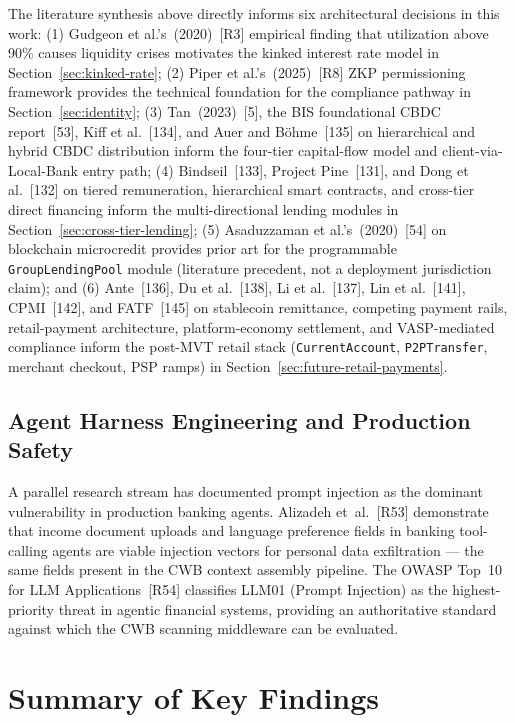 \documentclass[12pt,a4paper]{report}
\begin{document}
The literature synthesis above directly informs six architectural decisions in this work: (1) Gudgeon et al.'s~(2020)~[R3] empirical finding that utilization above 90\% causes liquidity crises motivates the kinked interest rate model in Section~\ref{sec:kinked-rate}; (2) Piper et al.'s~(2025)~[R8] ZKP permissioning framework provides the technical foundation for the compliance pathway in Section~\ref{sec:identity}; (3) Tan~(2023)~[5], the BIS foundational CBDC report~[53], Kiff et al.~[134], and Auer and B\"{o}hme~[135] on hierarchical and hybrid CBDC distribution inform the four-tier capital-flow model and client-via-Local-Bank entry path; (4) Bindseil~[133], Project Pine~[131], and Dong et al.~[132] on tiered remuneration, hierarchical smart contracts, and cross-tier direct financing inform the multi-directional lending modules in Section~\ref{sec:cross-tier-lending}; (5) Asaduzzaman et al.'s~(2020)~[54] on blockchain microcredit provides prior art for the programmable \texttt{GroupLendingPool} module (literature precedent, not a deployment jurisdiction claim); and (6) Ante~[136], Du et al.~[138], Li et al.~[137], Lin et al.~[141], CPMI~[142], and FATF~[145] on stablecoin remittance, competing payment rails, retail-payment architecture, platform-economy settlement, and VASP-mediated compliance inform the post-MVT retail stack (\texttt{CurrentAccount}, \texttt{P2PTransfer}, merchant checkout, PSP ramps) in Section~\ref{sec:future-retail-payments}.

\subsection{Agent Harness Engineering and Production Safety}
\label{sec:harness-lit}

A parallel research stream has documented prompt injection as the dominant
vulnerability in production banking agents. Alizadeh et~al.~[R53]
demonstrate that income document uploads and language preference fields in
banking tool-calling agents are viable injection vectors for personal data
exfiltration --- the same fields present in the CWB context assembly pipeline.
The OWASP Top~10 for LLM Applications~[R54] classifies LLM01 (Prompt
Injection) as the highest-priority threat in agentic financial systems, providing
an authoritative standard against which the CWB scanning middleware can be
evaluated.

\section{Summary of Key Findings}
\end{document}
